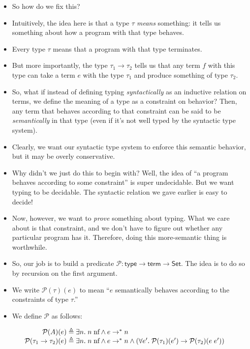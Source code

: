 \documentclass{lecturenotes}
\newcommand{\app}[2]{\ensuremath{#1\;#2}}
\newcommand{\nf}[1]{#1\;\text{nf}}
\begin{document}
\begin{itemize}
\item So how do we fix this?
\item Intuitively, the idea here is that a type $\tau$ \emph{means} something: it tells us something about how a program with that type behaves.
\item Every type $\tau$ means that a program with that type terminates.
\item But more importantly, the type $\tau_1 \to \tau_2$ tells us that any term $f$ with this type can take a term $e$ with the type $\tau_1$ and produce something of type $\tau_2$.
\item So, what if instead of defining typing \emph{syntactically} as an inductive relation on terms, we define the meaning of a type as a constraint on behavior?
  Then, any term that behaves according to that constraint can be said to be \emph{semantically} in that type (even if it's not well typed by the syntactic type system).
\item Clearly, we want our syntactic type system to enforce this semantic behavior, but it may be overly conservative.
\item Why didn't we just do this to begin with?
  Well, the idea of ``a program behaves according to some constraint'' is super undecidable.
  But we want typing to be decidable.
  The syntactic relation we gave earlier is easy to decide!
\item Now, however, we want to \emph{prove} something about typing.
  What we care about is that constraint, and we don't have to figure out whether any particular program has it.
  Therefore, doing this more-semantic thing is worthwhile.
\item So, our job is to build a predicate $\mathcal{P} \colon \textsf{type} \to \textsf{term} \to \textsf{Set}$.
  The idea is to do so by recursion on the first argument.
\item  We write $\mathcal{P}(\tau)(e)$ to mean ``$e$ semantically behaves according to the constraints of type $\tau$.''
\item We define $\mathcal{P}$ as follows:
\end{itemize}

$$
\begin{array}{r@{\;\triangleq\;}l}
  \mathcal{P}(A)(e) & \exists n.\; \nf{n} \land e \to^\ast n\\
  \mathcal{P}(\tau_1 \to \tau_2)(e) & \exists n.\;\nf{n} \land e \to^\ast n \land (\forall e'.\; \mathcal{P}(\tau_1)(e') \to \mathcal{P}(\tau_2)(\app{e}{e'}))
\end{array}
$$
\end{document}
